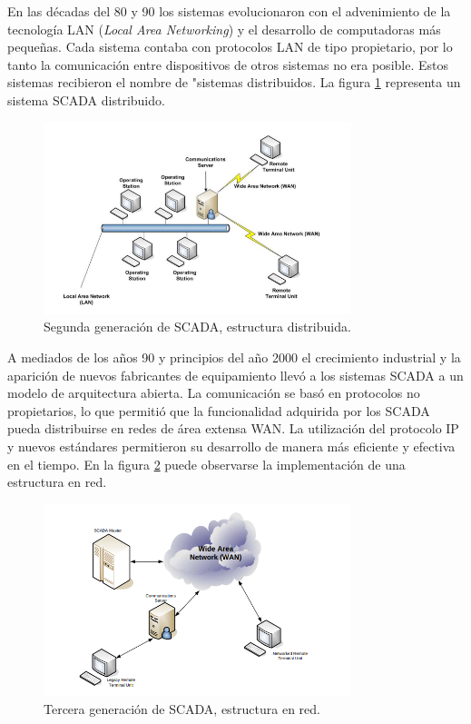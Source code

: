 En las décadas del 80 y 90 los sistemas evolucionaron con el advenimiento de la tecnología LAN (\textit{Local Area Networking}) y el desarrollo de computadoras más pequeñas. Cada sistema contaba con protocolos LAN de tipo propietario, por lo tanto  la comunicación entre dispositivos de otros sistemas no era posible. Estos sistemas recibieron el nombre de "sistemas distribuidos\citep{ARTICLE1}. La figura \ref{fig:SCDIS} representa un sistema SCADA distribuido.

\begin{figure}[htbp]
	\centering
	\includegraphics[width=0.8\textwidth]{./Figures/SCADA_DISTRIBUIDO.png}
	\caption{Segunda generación de SCADA, estructura distribuida.\citep{BOOK:2}}
	\label{fig:SCDIS}
\end{figure}

A mediados de los años 90 y principios del año 2000 el crecimiento industrial y la aparición de nuevos fabricantes de equipamiento llevó a los sistemas SCADA a un modelo de arquitectura abierta. La comunicación se basó en protocolos no propietarios, lo que permitió que la funcionalidad adquirida por los SCADA pueda distribuirse en redes de área extensa WAN. La utilización del protocolo IP y nuevos estándares permitieron su desarrollo de manera más eficiente y efectiva en el tiempo\citep{ARTICLE1}. En la figura \ref{fig:SCNET} puede observarse la implementación de una estructura en red.

\begin{figure}[htbp]
	\centering
	\includegraphics[width=0.8\textwidth]{./Figures/SCADA_NETWORKED.png}
	\caption{Tercera generación de SCADA, estructura en red.\citep{BOOK:2}}
	\label{fig:SCNET}
\end{figure}


